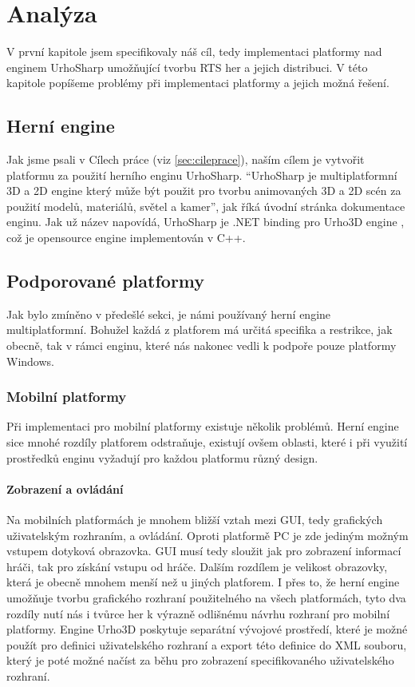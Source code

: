 \chapter{Analýza}
V první kapitole jsem specifikovaly náš cíl, tedy implementaci platformy nad enginem UrhoSharp umožňující tvorbu RTS her a jejich distribuci. V této kapitole popíšeme problémy při implementaci platformy a jejich možná řešení.

\section{Herní engine}
Jak jsme psali v Cílech práce (viz \ref{sec:cileprace}), naším cílem je vytvořit platformu za použití herního enginu UrhoSharp. ``UrhoSharp je multiplatformní 3D a 2D engine který může být použit pro tvorbu animovaných 3D a 2D scén za použití modelů, materiálů, světel a kamer''\citep{site:urhosharp}, jak říká úvodní stránka dokumentace enginu. Jak už název napovídá, UrhoSharp je .NET binding pro Urho3D engine \citep{site:urho3D}, což je opensource engine implementován v C++.


\section{Podporované platformy}
Jak bylo zmíněno v předešlé sekci, je námi používaný herní engine multiplatformní. Bohužel každá z platforem má určitá specifika a restrikce, jak obecně, tak v rámci enginu, které nás nakonec vedli k podpoře pouze platformy Windows. 

\subsection{Mobilní platformy}
Při implementaci pro mobilní platformy existuje několik problémů.
Herní engine sice mnohé rozdíly platforem odstraňuje, existují ovšem oblasti, které i při využití prostředků enginu vyžadují pro každou platformu různý design.

\subsubsection{Zobrazení a ovládání}
Na mobilních platformách je mnohem bližší vztah mezi GUI, tedy grafických uživatelským rozhraním, a ovládání. Oproti platformě PC je zde jediným možným vstupem dotyková obrazovka. GUI musí tedy sloužit jak pro zobrazení informací hráči, tak pro získání vstupu od hráče. Dalším rozdílem je velikost obrazovky, která je obecně mnohem menší než u jiných platforem. I přes to, že herní engine umožňuje tvorbu grafického rozhraní použitelného na všech platformách, tyto dva rozdíly nutí nás i tvůrce her k výrazně odlišnému návrhu rozhraní pro mobilní platformy. Engine Urho3D poskytuje separátní vývojové prostředí, které je možné použít pro definici uživatelského rozhraní a export této definice do XML souboru, který je poté možné načíst za běhu pro zobrazení specifikovaného uživatelského rozhraní. 

